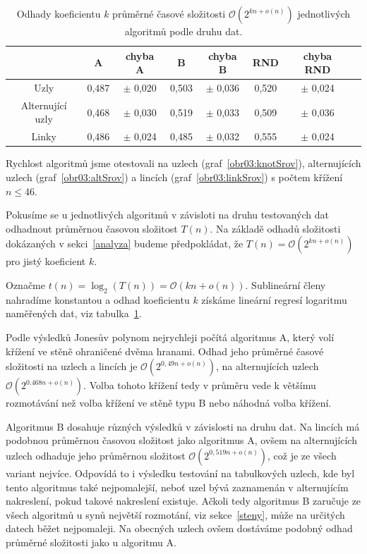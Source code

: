 \begin{table}[t]
\centering
  \begin{tabular}{*{8}{c}}
    \toprule
       & A & chyba A & B & chyba B &  RND & chyba RND \\ 
    \midrule
    Uzly  & 0,487 & $\pm$ 0,020  &   0,503 & $\pm$ 0,036   &  0,520 & $\pm$ 0,024\\
    Alternující uzly & 0,468  & $\pm$ 0,030 &  0,519 & $\pm$  0,033 & 0,509 & $\pm$ 0,036\\
    Linky  & 0,486 &  $\pm$ 0,024 &   0,485 & $\pm$  0,032  &   0,555 & $\pm$ 0,024\\
    \bottomrule
  \end{tabular}
    \caption{Odhady koeficientu $k$ průměrné časové složitosti $\mathcal{O}\left(2^{kn + o(n)}\right)$ jednotlivých algoritmů podle druhu dat.} \label{datatab}

\end{table} 

Rychlost algoritmů jsme otestovali na uzlech (graf~\ref{obr03:knotSrov}), alternujících uzlech (graf~\ref{obr03:altSrov}) a lincích (graf~\ref{obr03:linkSrov}) s počtem křížení $n \leq 46$. 

Pokusíme se u jednotlivých algoritmů v závisloti na druhu testovaných dat odhadnout průměrnou časovou složitost $T(n)$. Na základě odhadů složitosti dokázaných v sekci~\ref{analyza} budeme předpokládat, že $T(n) = \mathcal{O} \left(2^{kn + o(n)}\right)$ pro jistý koeficient $k$.

Označme $t(n) = \log_2(T(n)) = \mathcal{O} \left(kn + o(n)\right) $. Sublineární členy nahradíme konstantou a odhad koeficientu $k$ získáme lineární regresí logaritmu naměřených dat, viz tabulka~\ref{datatab}.

Podle výsledků Jonesův polynom nejrychleji počítá algoritmus A, který volí křížení ve stěně ohraničené dvěma hranami. Odhad jeho průměrné časové složitosti na uzlech a lincích je $\mathcal{O}\left(2^{0,49n+ o(n)}\right)$, na alternujících uzlech $\mathcal{O}\left(2^{0.468 n+ o(n)}\right)$. Volba tohoto křížení tedy v průměru vede k většímu rozmotávání než volba křížení ve stěně typu B nebo náhodná volba křížení. 

Algoritmus B dosahuje různých výsledků v závislosti na druhu dat. Na lincích má podobnou průměrnou časovou složitost jako algoritmus A, ovšem na alternujících uzlech odhaduje jeho průměrnou složitost $\mathcal{O}\left(2^{0,519 n+ o(n)}\right)$, což je ze všech variant nejvíce. Odpovídá to i výsledku testování na tabulkových uzlech, kde byl tento algoritmus také nejpomalejší, neboť uzel bývá zaznamenán v alternujícím nakreslení, pokud takové nakreslení existuje. Ačkoli tedy algoritmus B zaručuje ze všech algoritmů u synů největší rozmotání, viz sekce~\ref{steny}, může na určitých datech běžet nejpomaleji. Na obecných uzlech ovšem dostáváme podobný odhad průměrné složitosti jako u algoritmu A.

